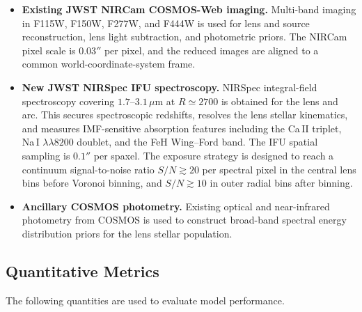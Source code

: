 \documentclass{article}
\begin{document}
\begin{itemize}
    \item \textbf{Existing JWST NIRCam COSMOS-Web imaging.} Multi-band imaging in F115W, F150W, F277W, and F444W is used for lens and source reconstruction, lens light subtraction, and photometric priors. The NIRCam pixel scale is $0.03''$ per pixel, and the reduced images are aligned to a common world-coordinate-system frame.
    \item \textbf{New JWST NIRSpec IFU spectroscopy.} NIRSpec integral-field spectroscopy covering $1.7$--$3.1\,\mu$m at $R\simeq2700$ is obtained for the lens and arc. This secures spectroscopic redshifts, resolves the lens stellar kinematics, and measures IMF-sensitive absorption features including the Ca\,II triplet, Na\,I $\lambda\lambda8200$ doublet, and the FeH Wing--Ford band. The IFU spatial sampling is $0.1''$ per spaxel. The exposure strategy is designed to reach a continuum signal-to-noise ratio $S/N\gtrsim20$ per spectral pixel in the central lens bins before Voronoi binning, and $S/N\gtrsim10$ in outer radial bins after binning.
    \item \textbf{Ancillary COSMOS photometry.} Existing optical and near-infrared photometry from COSMOS is used to construct broad-band spectral energy distribution priors for the lens stellar population.
\end{itemize}

\subsection{Quantitative Metrics}
The following quantities are used to evaluate model performance.
\end{document}
